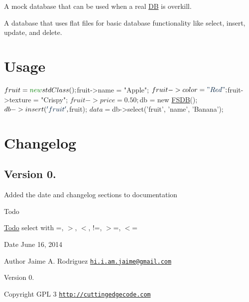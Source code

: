 A mock database that can be used when a real \hyperlink{class_d_b}{D\-B} is overkill.

A database that uses flat files for basic database functionality like select, insert, update, and delete.\hypertarget{nav1_usage}{}\section{Usage}\label{nav1_usage}

\begin{DoxyCode}
$fruit = \textcolor{keyword}{new} stdClass();
$fruit->name = \textcolor{stringliteral}{"Apple"};
$fruit->color = \textcolor{stringliteral}{"Red"};
$fruit->texture = \textcolor{stringliteral}{"Crispy"};
$fruit->price = 0.50;

$db = \textcolor{keyword}{new} \hyperlink{class_f_s_d_b}{FSDB}();
$db->insert(\textcolor{stringliteral}{'fruit'}, $fruit);
$data = $db->select(\textcolor{stringliteral}{'fruit'}, \textcolor{stringliteral}{'name'}, \textcolor{stringliteral}{'Banana'});
\end{DoxyCode}
\hypertarget{nav1_changelog}{}\section{Changelog}\label{nav1_changelog}
\subsection*{Version 0.}


\begin{DoxyItemize}
\item Added the date and changelog sections to documentation
\end{DoxyItemize}

\begin{DoxyRefDesc}{Todo}
\item[\hyperlink{todo__todo000002}{Todo}]select with =, $>$, $<$, !=, $>$=, $<$=\end{DoxyRefDesc}


\begin{DoxyDate}{Date}
June 16, 2014 
\end{DoxyDate}
\begin{DoxyAuthor}{Author}
Jaime A. Rodriguez \href{mailto:hi.i.am.jaime@gmail.com}{\tt hi.\-i.\-am.\-jaime@gmail.\-com} 
\end{DoxyAuthor}
\begin{DoxyVersion}{Version}
0. 
\end{DoxyVersion}
\begin{DoxyCopyright}{Copyright}
G\-P\-L 3 \href{http://cuttingedgecode.com}{\tt http\-://cuttingedgecode.\-com} 
\end{DoxyCopyright}
